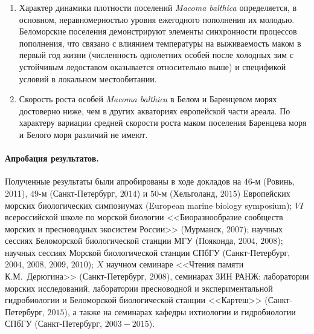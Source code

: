 \begin{enumerate}
\item Характер динамики плотности поселений \textit{Macoma balthica} определяется, в основном, неравномерностью  уровня ежегодного пополнения их молодью. 
Беломорские поселения демонстрируют элементы синхронности процессов пополнения, что связано с влиянием температуры на выживаемость маком в первый год жизни  (численность однолетних особей после холодных зим с устойчивым ледоставом оказывается относительно выше) и спецификой условий в локальном местообитании.

\item Скорость роста особей \textit{Macoma balthica} в Белом и Баренцевом морях достоверно ниже, чем в других акваториях европейской части ареала. 
По характеру вариации средней скорости роста маком поселения Баренцева моря и Белого моря различий не имеют. 

\end{enumerate}


\paragraph{Апробация результатов.}

Полученные результаты были апробированы в ходе докладов на 
$46$-м (Ровинь, 2011), $49$-м (Санкт-Петербург, $2014$) и $50$-м (Хельголанд, $2015$) Европейских морских биологических симпозиумах (European marine biology symposium); 
$VI$ всероссийской школе по морской биологии <<Биоразнообразие сообществ морских и пресноводных экосистем России>> (Мурманск, $2007$); 
научных сессиях Беломорской биологической станции МГУ (Пояконда, $2004$, $2008$); 
научных сессиях Морской биологической станции СПбГУ (Санкт-Петербург, $2004$, $2008$, $2009$, $2010$); 
$X$ научном семинаре <<Чтения памяти К.М.~Дерюгина>> (Санкт-Петербург, $2008$),
семинарах ЗИН РАНЖ: лаборатории морских исследований, лаборатории пресноводной и экспериментальной гидробиологии и Беломорской биологической станции <<Картеш>> (Санкт-Петербург, $2015$),
а также на семинарах кафедры  ихтиологии и гидробиологии СПбГУ (Санкт-Петербург, $2003 - 2015$).

